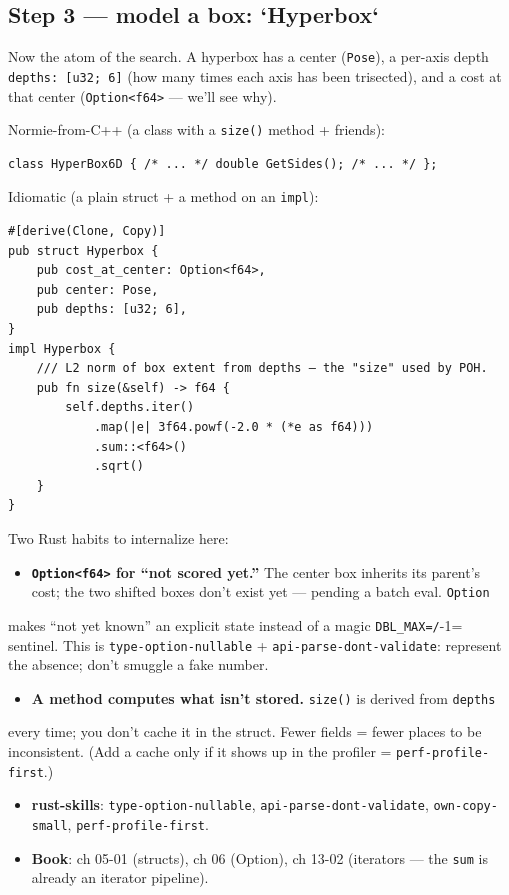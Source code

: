 \documentclass[11pt]{article}
\begin{document}
\subsection{Step 3 — model a box: `Hyperbox`}
\label{sec:org189a25f}

Now the atom of the search. A hyperbox has a center (\texttt{Pose}), a per-axis depth
\texttt{depths: [u32; 6]} (how many times each axis has been trisected), and a cost at
that center (\texttt{Option<f64>} — we'll see why).

Normie-from-C++ (a class with a \texttt{size()} method + friends):
\begin{verbatim}
class HyperBox6D { /* ... */ double GetSides(); /* ... */ };
\end{verbatim}

Idiomatic (a plain struct + a method on an \texttt{impl}):
\begin{verbatim}
#[derive(Clone, Copy)]
pub struct Hyperbox {
    pub cost_at_center: Option<f64>,
    pub center: Pose,
    pub depths: [u32; 6],
}
impl Hyperbox {
    /// L2 norm of box extent from depths — the "size" used by POH.
    pub fn size(&self) -> f64 {
        self.depths.iter()
            .map(|e| 3f64.powf(-2.0 * (*e as f64)))
            .sum::<f64>()
            .sqrt()
    }
}
\end{verbatim}

Two Rust habits to internalize here:

\begin{itemize}
\item \textbf{\textbf{\texttt{Option<f64>} for ``not scored yet.''}} The center box inherits its parent's
cost; the two shifted boxes don't exist yet — pending a batch eval. \texttt{Option}
\end{itemize}
makes ``not yet known'' an explicit state instead of a magic \texttt{DBL\_MAX=/}-1=
sentinel. This is \texttt{type-option-nullable} + \texttt{api-parse-dont-validate}: represent
  the absence; don't smuggle a fake number.
\begin{itemize}
\item \textbf{\textbf{A method computes what isn't stored.}} \texttt{size()} is derived from \texttt{depths}
\end{itemize}
every time; you don't cache it in the struct. Fewer fields = fewer places to be
inconsistent. (Add a cache only if it shows up in the profiler =
\texttt{perf-profile-first}.)

\begin{itemize}
\item \textbf{\textbf{rust-skills}}: \texttt{type-option-nullable}, \texttt{api-parse-dont-validate},
\texttt{own-copy-small}, \texttt{perf-profile-first}.
\item \textbf{\textbf{Book}}: ch 05-01 (structs), ch 06 (Option), ch 13-02 (iterators — the \texttt{sum}
is already an iterator pipeline).
\end{itemize}
\end{document}
